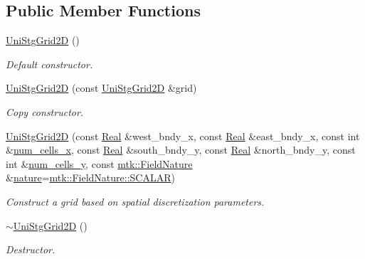 \subsection*{Public Member Functions}
\begin{DoxyCompactItemize}
\item 
\hyperlink{classmtk_1_1UniStgGrid2D_a40db9a6d21e0f4cf70c478fcc3b94531}{Uni\+Stg\+Grid2\+D} ()
\begin{DoxyCompactList}\small\item\em Default constructor. \end{DoxyCompactList}\item 
\hyperlink{classmtk_1_1UniStgGrid2D_aab6e54b48c3f32de808460ef46f598d4}{Uni\+Stg\+Grid2\+D} (const \hyperlink{classmtk_1_1UniStgGrid2D}{Uni\+Stg\+Grid2\+D} \&grid)
\begin{DoxyCompactList}\small\item\em Copy constructor. \end{DoxyCompactList}\item 
\hyperlink{classmtk_1_1UniStgGrid2D_a9d96b31002c1deb3a90954bbb112487e}{Uni\+Stg\+Grid2\+D} (const \hyperlink{group__c01-roots_gac080bbbf5cbb5502c9f00405f894857d}{Real} \&west\+\_\+bndy\+\_\+x, const \hyperlink{group__c01-roots_gac080bbbf5cbb5502c9f00405f894857d}{Real} \&east\+\_\+bndy\+\_\+x, const int \&\hyperlink{classmtk_1_1UniStgGrid2D_a2d182866a398aba8e4829590e85bf939}{num\+\_\+cells\+\_\+x}, const \hyperlink{group__c01-roots_gac080bbbf5cbb5502c9f00405f894857d}{Real} \&south\+\_\+bndy\+\_\+y, const \hyperlink{group__c01-roots_gac080bbbf5cbb5502c9f00405f894857d}{Real} \&north\+\_\+bndy\+\_\+y, const int \&\hyperlink{classmtk_1_1UniStgGrid2D_aed05a801cc9a76dba0ff203cea58a61a}{num\+\_\+cells\+\_\+y}, const \hyperlink{group__c02-enums_ga4c54f2a329cfb4e56213b02a259d19e2}{mtk\+::\+Field\+Nature} \&\hyperlink{classmtk_1_1UniStgGrid2D_a99a3a9cdb05b7306be99bde935509e30}{nature}=\hyperlink{namespacemtk_ga4c54f2a329cfb4e56213b02a259d19e2a8f3d9a4b6a7b7f2c7afa61ca113d0db9}{mtk\+::\+Field\+Nature\+::\+S\+C\+A\+L\+A\+R})
\begin{DoxyCompactList}\small\item\em Construct a grid based on spatial discretization parameters. \end{DoxyCompactList}\item 
\hyperlink{classmtk_1_1UniStgGrid2D_a55615fed9674be8d8a48a1105e5a1476}{$\sim$\+Uni\+Stg\+Grid2\+D} ()
\begin{DoxyCompactList}\small\item\em Destructor. \end{DoxyCompactList}\item 

\end{DoxyCompactItemize}
